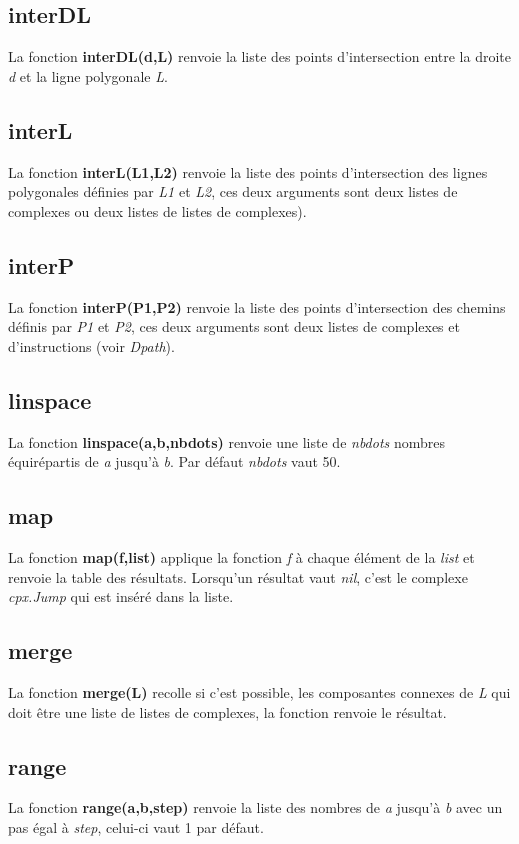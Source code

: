 \subsection{interDL}
La fonction \textbf{interDL(d,L)} renvoie la liste des points d'intersection entre la droite \emph{d} et la ligne polygonale \emph{L}.

\subsection{interL}
La fonction \textbf{interL(L1,L2)} renvoie la liste des points d'intersection des lignes polygonales définies par \emph{L1} et \emph{L2}, ces deux arguments sont deux listes de complexes ou deux listes de listes de complexes).

\subsection{interP}
La fonction \textbf{interP(P1,P2)} renvoie la liste des points d'intersection des chemins définis par \emph{P1} et \emph{P2}, ces deux arguments sont deux listes de complexes et d'instructions (voir \emph{Dpath}).

\subsection{linspace}
La fonction \textbf{linspace(a,b,nbdots)} renvoie une liste de \emph{nbdots} nombres équirépartis de \emph{a} jusqu'à \emph{b}. Par défaut \emph{nbdots} vaut 50.

\subsection{map}
La fonction \textbf{map(f,list)} applique la fonction \emph{f} à chaque élément de la \emph{list} et renvoie la table des résultats. Lorsqu'un résultat vaut \emph{nil}, c'est le complexe \emph{cpx.Jump} qui est inséré dans la liste.

\subsection{merge}
La fonction \textbf{merge(L)} recolle si c'est possible, les composantes connexes de \emph{L} qui doit être une liste de listes de complexes, la fonction renvoie le résultat.

\subsection{range}
La fonction \textbf{range(a,b,step)} renvoie la liste des nombres de \emph{a} jusqu'à \emph{b} avec un pas égal à \emph{step}, celui-ci vaut 1 par défaut.

